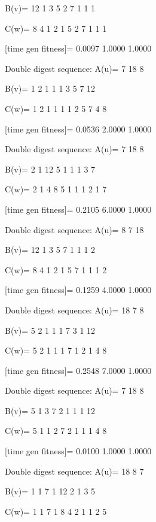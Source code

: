 B(v)=
    12     1     3     5     2     7     1     1     1

C(w)=
     8     4     1     2     1     5     2     7     1     1     1

[time gen fitness]=
    0.0097    1.0000    1.0000

Double digest sequence:
A(u)=
     7    18     8

B(v)=
     1     2     1     1     1     3     5     7    12

C(w)=
     1     2     1     1     1     1     2     5     7     4     8

[time gen fitness]=
    0.0536    2.0000    1.0000

Double digest sequence:
A(u)=
     7    18     8

B(v)=
     2     1    12     5     1     1     1     3     7

C(w)=
     2     1     4     8     5     1     1     1     2     1     7

[time gen fitness]=
    0.2105    6.0000    1.0000

Double digest sequence:
A(u)=
     8     7    18

B(v)=
    12     1     3     5     7     1     1     1     2

C(w)=
     8     4     1     2     1     5     7     1     1     1     2

[time gen fitness]=
    0.1259    4.0000    1.0000

Double digest sequence:
A(u)=
    18     7     8

B(v)=
     5     2     1     1     1     7     3     1    12

C(w)=
     5     2     1     1     1     7     1     2     1     4     8

[time gen fitness]=
    0.2548    7.0000    1.0000

Double digest sequence:
A(u)=
     7    18     8

B(v)=
     5     1     3     7     2     1     1     1    12

C(w)=
     5     1     1     2     7     2     1     1     1     4     8

[time gen fitness]=
    0.0100    1.0000    1.0000

Double digest sequence:
A(u)=
    18     8     7

B(v)=
     1     1     7     1    12     2     1     3     5

C(w)=
     1     1     7     1     8     4     2     1     1     2     5

